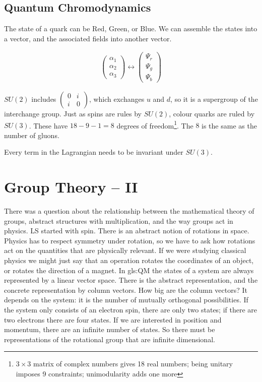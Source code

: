 \documentclass[]{article}
\begin{document}
\subsection{Quantum Chromodynamics}

The state of a quark can be Red, Green, or Blue. We can assemble the states into a vector, and the associated fields into another vector.

\begin{align*}
	\begin{pmatrix}
		\alpha_1\\
		\alpha_2\\
		\alpha_3
	\end{pmatrix} \leftrightarrow	\begin{pmatrix}
	\Psi_r\\
	\Psi_g\\
	\Psi_b
	\end{pmatrix}
\end{align*}

 $SU(2)$ includes $\begin{pmatrix}
	0&i\\
	i&0
\end{pmatrix}$, which exchanges $u$ and $d$, so it is a supergroup of the interchange group. Just as spins are rules by $SU(2)$, colour quarks are ruled by $SU(3)$. These have $18-9-1=8$ degrees of freedom\footnote{$3\times 3$ matrix of complex numbers gives 18 real numbers; being unitary imposes 9 constraints; unimodularity adds one more}. The $8$ is the same as the number of gluons.

 Every term in the Lagrangian needs to be invariant under $SU(3)$.   
\section{Group Theory – II}



There was a question about the relationship between the mathematical theory of groups, abstract structures with multiplication, and the way groups act in physics. LS started with spin. There is an abstract notion of rotations in space. Physics has to respect symmetry under rotation, so we have to ask how rotations act on the quantities that are physically relevant. If we were studying classical physics we might just say that an operation rotates the coordinates of an object, or rotates the direction of a magnet. In \gls{gls:QM} the states of a system are always represented by a linear vector space. There is the abstract representation, and the concrete representation by column vectors. How big are the column vectors? It depends on the system: it is the number of mutually orthogonal possibilities. If the system only consists of an electron spin, there are only two states; if there are two electrons there are four states. If we are interested in position and momentum, there are an infinite number of states. So there must be representations of the rotational group that are infinite dimensional.
\end{document}
